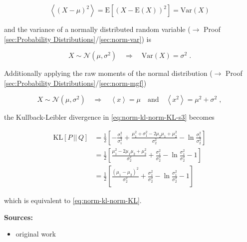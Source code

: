 \documentclass[a4paper,12pt,twoside]{book}
\begin{document}
\begin{equation} \label{eq:norm-kl-var}
\left\langle (X-\mu)^2 \right\rangle = \mathrm{E}[(X-\mathrm{E}(X))^2] = \mathrm{Var}(X)
\end{equation}

and the variance of a normally distributed random variable ($\rightarrow$ Proof \ref{sec:Probability Distributions}/\ref{sec:norm-var}) is

\begin{equation} \label{eq:norm-kl-norm-var}
X \sim \mathcal{N}(\mu, \sigma^2) \quad \Rightarrow \quad \mathrm{Var}(X) = \sigma^2 \; .
\end{equation}

Additionally applying the raw moments of the normal distribution ($\rightarrow$ Proof \ref{sec:Probability Distributions}/\ref{sec:norm-mgf})

\begin{equation} \label{eq:norm-kl-norm-mom-raw}
X \sim \mathcal{N}(\mu, \sigma^2) \quad \Rightarrow \quad \left\langle x \right\rangle = \mu \quad \text{and} \quad \left\langle x^2 \right\rangle = \mu^2 + \sigma^2 \; ,
\end{equation}

the Kullback-Leibler divergence in \eqref{eq:norm-kl-norm-KL-s3} becomes

\begin{equation} \label{eq:norm-kl-norm-KL-s4}
\begin{split}
\mathrm{KL}[P\,||\,Q] &= \frac{1}{2} \left[ - \frac{\sigma_1^2}{\sigma_1^2} + \frac{\mu_1^2 + \sigma_1^2 - 2 \mu_2 \mu_1 + \mu_2^2}{\sigma_2^2} - \ln \frac{\sigma_1^2}{\sigma_2^2} \right] \\
&= \frac{1}{2} \left[ \frac{\mu_1^2 - 2 \mu_1 \mu_2 + \mu_2^2}{\sigma_2^2} + \frac{\sigma_1^2}{\sigma_2^2} - \ln \frac{\sigma_1^2}{\sigma_2^2} - 1 \right] \\
&= \frac{1}{2} \left[ \frac{(\mu_1 - \mu_2)^2}{\sigma_2^2} + \frac{\sigma_1^2}{\sigma_2^2} - \ln \frac{\sigma_1^2}{\sigma_2^2} - 1 \right]
\end{split}
\end{equation}

which is equivalent to \eqref{eq:norm-kl-norm-KL}.


\vspace{1em}
\textbf{Sources:}
\begin{itemize}
\item original work\end{itemize}
\end{document}
